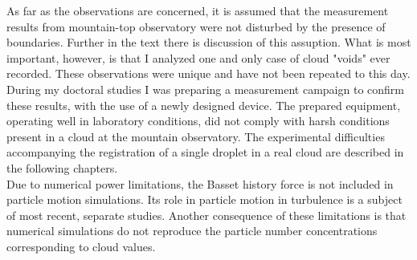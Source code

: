 \documentclass[../main.tex]{subfiles}
\begin{document}
As far as the observations are concerned, it is assumed that the measurement results from mountain-top observatory were not disturbed by the presence of boundaries. Further in the text there is discussion of this assuption. What is most important, however, is that I analyzed one and only case of cloud "voids" ever recorded. These observations were unique and have not been repeated to this day. During my doctoral studies I was preparing a measurement campaign to confirm these results, with the use of a newly designed device. The prepared equipment, operating well in laboratory conditions, did not comply with harsh conditions present in a cloud at the mountain observatory. The experimental difficulties accompanying the registration of a single droplet in a real cloud are described in the following chapters.\\
Due to numerical power limitations, the Basset history force is not included in particle motion simulations. Its role in particle motion in turbulence is a subject of most recent, separate studies. Another consequence of these limitations is that numerical simulations do not reproduce the particle number concentrations corresponding to cloud values.\\




\end{document}
